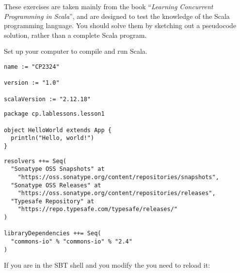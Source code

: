 \documentclass[11pt]{article}
\begin{document}
\myHeader

These exercises are taken mainly from the book ``\emph{Learning Concurrent Programming in Scala}'', and are designed to test the knowledge of the Scala programming language. You should solve them by sketching out a pseudocode solution, rather than a complete Scala program.

\begin{myExercise} Set up your computer to compile and run Scala.
\begin{lstlisting}
name := "CP2324"

version := "1.0"

scalaVersion := "2.12.18"
\end{lstlisting}
\begin{lstlisting}
package cp.lablessons.lesson1

object HelloWorld extends App {
  println("Hello, world!")
}
\end{lstlisting}

\begin{lstlisting}
resolvers ++= Seq(
  "Sonatype OSS Snapshots" at
    "https://oss.sonatype.org/content/repositories/snapshots",
  "Sonatype OSS Releases" at
    "https://oss.sonatype.org/content/repositories/releases",
  "Typesafe Repository" at
    "https://repo.typesafe.com/typesafe/releases/"
)

libraryDependencies ++= Seq(
  "commons-io" % "commons-io" % "2.4"
)
\end{lstlisting}
If you are in the SBT shell and you modify the  you need to reload it:
\\

\end{myExercise}
\end{document}
